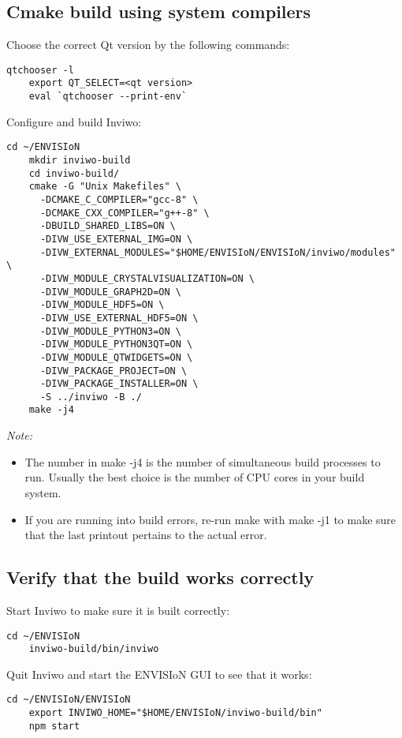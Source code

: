 \subsection{Cmake build using system compilers}
Choose the correct Qt version by the following commands:

\begin{lstlisting}[frame = single, breaklines=true]
    qtchooser -l
    export QT_SELECT=<qt version>
    eval `qtchooser --print-env`
\end{lstlisting}

Configure and build Inviwo:

\begin{lstlisting}[frame = single, breaklines=true]
    cd ~/ENVISIoN
    mkdir inviwo-build
    cd inviwo-build/
    cmake -G "Unix Makefiles" \
      -DCMAKE_C_COMPILER="gcc-8" \
      -DCMAKE_CXX_COMPILER="g++-8" \
      -DBUILD_SHARED_LIBS=ON \
      -DIVW_USE_EXTERNAL_IMG=ON \
      -DIVW_EXTERNAL_MODULES="$HOME/ENVISIoN/ENVISIoN/inviwo/modules" \
      -DIVW_MODULE_CRYSTALVISUALIZATION=ON \
      -DIVW_MODULE_GRAPH2D=ON \
      -DIVW_MODULE_HDF5=ON \
      -DIVW_USE_EXTERNAL_HDF5=ON \
      -DIVW_MODULE_PYTHON3=ON \
      -DIVW_MODULE_PYTHON3QT=ON \
      -DIVW_MODULE_QTWIDGETS=ON \
      -DIVW_PACKAGE_PROJECT=ON \
      -DIVW_PACKAGE_INSTALLER=ON \
      -S ../inviwo -B ./
    make -j4
\end{lstlisting}

\emph{Note:}
\begin{itemize}
     \item The number in make -j4 is the number of simultaneous build processes to run. Usually the best choice is the number of CPU cores in your build system.
     \item If you are running into build errors, re-run make with make -j1 to make sure that the last printout pertains to the actual error.
\end{itemize}

\subsection{Verify that the build works correctly}
Start Inviwo to make sure it is built correctly:

\begin{lstlisting}[frame = single, breaklines=true]
    cd ~/ENVISIoN
    inviwo-build/bin/inviwo
\end{lstlisting}

Quit Inviwo and start the ENVISIoN GUI to see that it works:

\begin{lstlisting}[frame = single, breaklines=true]
    cd ~/ENVISIoN/ENVISIoN
    export INVIWO_HOME="$HOME/ENVISIoN/inviwo-build/bin"
    npm start
\end{lstlisting}

\newpage